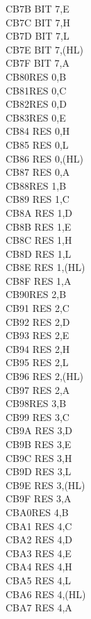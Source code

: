 \documentclass[oneside,a4paper]{book}
\begin{document}
\begin{multicols}{3}
{\begin{tabbing}
CB7B\> 	BIT 7,E\\
CB7C\> 	BIT 7,H\\
CB7D\> 	BIT 7,L\\
CB7E\> 	BIT 7,(HL)\\
CB7F\> 	BIT 7,A\\
CB80\>RES 0,B\\
CB81\>RES 0,C\\
CB82\>RES 0,D\\
CB83\>RES 0,E\\
CB84\> 	RES 0,H\\
CB85\> 	RES 0,L\\
CB86\> 	RES 0,(HL)\\
CB87\> 	RES 0,A\\
CB88\>RES 1,B\\
CB89\> 	RES 1,C\\
CB8A\> 	RES 1,D\\
CB8B\> 	RES 1,E\\
CB8C\> 	RES 1,H\\
CB8D\> 	RES 1,L\\
CB8E\> 	RES 1,(HL)\\
CB8F\> 	RES 1,A\\
CB90\>RES 2,B\\
CB91\> 	RES 2,C\\
CB92\> 	RES 2,D\\
CB93\> 	RES 2,E\\
CB94\> 	RES 2,H\\
CB95\> 	RES 2,L\\
CB96\> 	RES 2,(HL)\\
CB97\> 	RES 2,A\\
CB98\>RES 3,B\\
CB99\> 	RES 3,C\\
CB9A\> 	RES 3,D\\
CB9B\> 	RES 3,E\\
CB9C\> 	RES 3,H\\
CB9D\> 	RES 3,L\\
CB9E\> 	RES 3,(HL)\\
CB9F\> 	RES 3,A\\
CBA0\>RES 4,B\\
CBA1\> 	RES 4,C\\
CBA2\> 	RES 4,D\\
CBA3\> 	RES 4,E\\
CBA4\> 	RES 4,H\\
CBA5\> 	RES 4,L\\
CBA6\> 	RES 4,(HL)\\
CBA7\> 	RES 4,A\\

\end{tabbing}}
\end{multicols}
\end{document}
